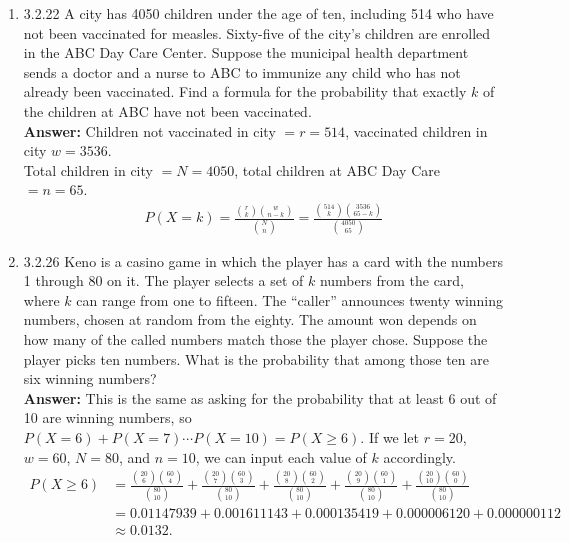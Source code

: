 \documentclass{article}
\begin{document}
\begin{enumerate}
        \item 3.2.22 A city has 4050 children under the age of ten, including 514 who have not been vaccinated for measles. Sixty-five of the city’s children are enrolled in the ABC Day Care Center. Suppose the municipal health department sends a doctor and a nurse to ABC to immunize any child who has not already been vaccinated. Find a formula for the probability that exactly $k$ of the children at ABC have not been vaccinated.\\
        \textbf{Answer: } Children not vaccinated in city $= r = 514$, vaccinated children in city $w = 3536$.\\
        Total children in city $= N = 4050$, total children at ABC Day Care $= n = 65$.
            \begin{align*}
                P(X=k) = \frac{{r \choose k}{w \choose n-k}}{{N \choose n}} = \frac{{514 \choose k}{3536 \choose 65-k}}{{4050 \choose 65}}
            \end{align*}
        
        \item 3.2.26 Keno is a casino game in which the player has a card with the numbers 1 through 80 on it. The player selects a set of $k$ numbers from the card, where $k$ can range from one to fifteen. The “caller” announces twenty winning numbers, chosen at random from the eighty. The amount won depends on how many of the called numbers match those the player chose. Suppose the player picks ten numbers. What is the probability that among those ten are six winning numbers?\\
        \textbf{Answer: }This is the same as asking for the probability that at least 6 out of 10 are winning numbers, so\\ $P(X=6)+P(X=7) \cdots P(X=10) = P(X \geq 6)$. If we let $r=20$, $w=60$, $N=80$, and $n=10$, we can input each value of $k$ accordingly.
            \begin{align*}
                P(X \geq 6) &= \frac{{20 \choose 6}{60 \choose 4}}{{80 \choose 10}}+ \frac{{20 \choose 7}{60 \choose 3}}{{80 \choose 10}}+ \frac{{20 \choose 8}{60 \choose 2}}{{80 \choose 10}}+ \frac{{20 \choose 9}{60 \choose 1}}{{80 \choose 10}}+ \frac{{20 \choose 10}{60 \choose 0}}{{80 \choose 10}}\\
                &= 0.01147939+0.001611143+0.000135419+0.000006120+0.000000112\\
                &\approx 0.0132. 
            \end{align*}
        

\end{enumerate}
\end{document}
